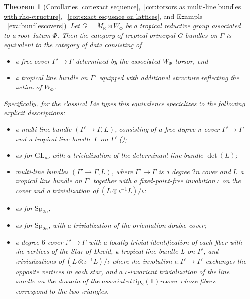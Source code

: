 \documentclass[10pt, a4paper]{amsart}
\newtheorem{maintheorem}{Theorem}[section]
\theoremstyle{definition}
\theoremstyle{myitemstyle}
\newcommand{\R}{\mathbb{R}}
\newcommand{\TT}{\mathbb{T}}
\newcommand{\Mcheck}{{\check{M}}}
\newcommand{\SL}{{\mathrm{SL}}}
\newcommand{\GL}{{\mathrm{GL}}}
\newcommand{\Sp}{{\mathrm{Sp}}}
\newcommand{\SO}{{\mathrm{SO}}}
\newcommand{\Ga}{\Gamma}
\begin{document}
\begin{maintheorem}[Corollaries \ref{cor:exact sequence},~\ref{cor:torsors as multi-line bundles with rho-structure}, ~\ref{cor:exact sequence on lattices}, and Example ~\ref{exa:bundlescovers}]
Let $G=\Mcheck_\R\rtimes W_\Phi$ be a tropical reductive group associated to a root datum $\Phi$. Then the category of tropical principal $G$-bundles on $\Gamma$ is equivalent to the category of data consisting of
\begin{itemize}
\item[(i)] a free cover $\Gamma'\to \Gamma$ determined by the associated $W_\Phi$-torsor, and
\item[(ii)] a tropical line bundle on $\Gamma'$ equipped with additional structure reflecting the action of $W_\Phi$.
\end{itemize}
Specifically, for the classical Lie types this equivalence specializes to the following explicit descriptions:
\begin{itemize}
\item[$\GL_n$:] a multi-line bundle $(\Gamma'\!\to\Gamma,L)$, consisting of a free degree $n$ cover $\Gamma'\to\Gamma$ and a tropical line bundle $L$ on $\Ga'$ (\cite[Prop 3.2]{2022GrossUlirschZakharov});
\item[$\SL_n$:] as for $\GL_n$, with a trivialization of the determinant line bundle $\det(L)$;
\item[$\Sp_{2n}$:] multi-line bundles $(\Gamma'\!\to\Gamma,L)$, where $\Gamma'\to\Gamma$ is a degree $2n$ cover and $L$ a tropical line bundle on $\Ga'$ together with a fixed-point-free involution $\iota$ on the cover and a trivialization of  $(L \otimes \iota^{-1}L)/\iota$; 
\item[$\SO_{2n+1}$:] as for $\Sp_{2n}$,
\item[$\SO_{2n}$:] as for $\Sp_{2n}$, with a trivialization of the orientation double cover;
\item[$\mathrm{G}_2$:] a degree $6$ cover $\Gamma'\to \Gamma$ with a locally trivial identification of each fiber with the vertices of the Star of David, a tropical line bundle $L$ on $\Ga'$, and trivializations of $(L \otimes \iota^{-1}L)/\iota$ where the involution $\iota:\Ga'\to \Ga'$ exchanges the opposite vertices in each star, and a $\iota$-invariant trivialization of the line bundle on the domain of the associated $\Sp_2(\TT)$-cover whose fibers correspond to the two triangles.
\end{itemize}

\end{maintheorem}
\end{document}
